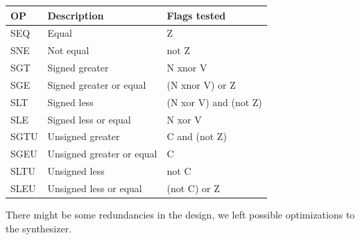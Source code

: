 \documentclass[12pt]{article}
\begin{document}
\begin{center}
	\begin{tabular}{ | l | l | l |}
		\hline
		OP & Description & Flags tested \\ \hline
		SEQ & Equal & Z \\ \hline
		SNE & Not equal &  not Z \\ \hline
		SGT & Signed greater & N xnor V \\ \hline
		SGE & Signed greater or equal & (N  xnor  V) or Z \\ \hline
		SLT & Signed less & (N xor V) and (not Z)\\ \hline
		SLE & Signed less or equal & N xor V \\ \hline
		SGTU & Unsigned greater & C and (not Z) \\ \hline
		SGEU & Unsigned greater or equal & C \\ \hline
		SLTU & Unsigned less & not C \\ \hline
		SLEU & Unsigned less or equal & (not C) or Z  \\ \hline

	\end{tabular}
\end{center}

There might be some redundancies in the design, we left possible optimizations to the synthesizer.
\end{document}

